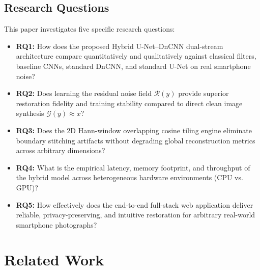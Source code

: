 \documentclass{ieeeaccess}
\begin{document}
\subsection{Research Questions}
This paper investigates five specific research questions:
\begin{itemize}
    \item \textbf{RQ1:} How does the proposed Hybrid U-Net--DnCNN dual-stream architecture compare quantitatively and qualitatively against classical filters, baseline CNNs, standard DnCNN, and standard U-Net on real smartphone noise?
    \item \textbf{RQ2:} Does learning the residual noise field $\mathcal{R}(y)$ provide superior restoration fidelity and training stability compared to direct clean image synthesis $\mathcal{G}(y) \approx x$?
    \item \textbf{RQ3:} Does the 2D Hann-window overlapping cosine tiling engine eliminate boundary stitching artifacts without degrading global reconstruction metrics across arbitrary dimensions?
    \item \textbf{RQ4:} What is the empirical latency, memory footprint, and throughput of the hybrid model across heterogeneous hardware environments (CPU vs. GPU)?
    \item \textbf{RQ5:} How effectively does the end-to-end full-stack web application deliver reliable, privacy-preserving, and intuitive restoration for arbitrary real-world smartphone photographs?
\end{itemize}

\section{Related Work}
\label{sec:related_work}
\end{document}
